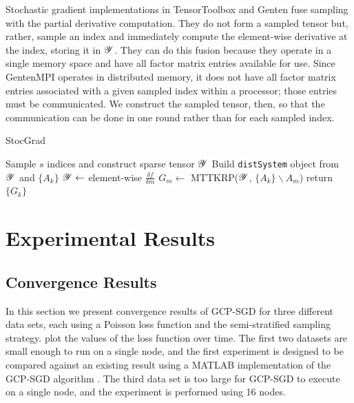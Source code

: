 Stochastic gradient implementations in TensorToolbox and Genten fuse 
sampling with the partial derivative computation.  They do not form a 
sampled tensor but, rather, sample an index and immediately compute
the element-wise derivative at the index, storing it in $\Y$. They can
do this fusion because they operate in a single memory space and have all 
factor matrix entries available for use.  Since GentenMPI operates in 
distributed memory, it does not have all factor matrix entries associated
with a given sampled index within a processor; those entries must be 
communicated.  We construct the sampled tensor, then, so that the 
communication can be done in one round rather than for each sampled index.



\begin{algorithm}
  \caption{StocGrad}
  \label{alg:sg}
  \begin{algorithmic}[1]
  \State \label{alg:sgsptensor} Sample $s$ indices and construct sparse tensor $\Y$
  \State \label{alg:sgsystem} Build {\tt distSystem} object from $\Y$ and $\{ A_k \}$
  \State \label{alg:sgdfdm} $\Y \gets $ element-wise $\frac{\delta f}{\delta m}$
    \State \label{alg:sgmttkrp} $G_m \gets $ MTTKRP($\Y$, $\{ A_k \} \backslash A_m$)
  \EndFor
  \State return $\{ G_k \}$
  \EndFunction
  \end{algorithmic}
\end{algorithm}


\section{Experimental Results} \label{sec:gcp_exp}

\subsection{Convergence Results}

In this section we present convergence results of GCP-SGD for three different data sets, each using a Poisson loss function and the semi-stratified sampling strategy.
 plot the values of the loss function over time.
The first two datasets are small enough to run on a single node, and the first experiment is designed to be compared against an existing result using a MATLAB implementation of the GCP-SGD algorithm \cite{KH19}.
The third data set is too large for GCP-SGD to execute on a single node, and the experiment is performed using 16 nodes.

